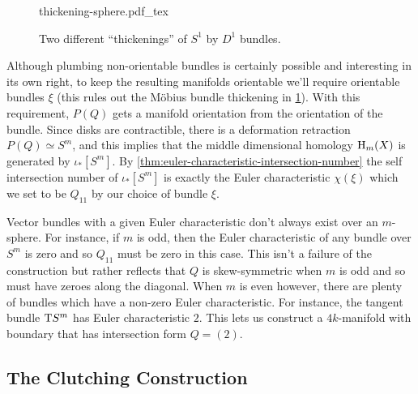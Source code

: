 \begin{figure}[ht]
	\centering
{thickening-sphere.pdf_tex}
\caption{Two different ``thickenings'' of $S^1$ by $D^1$ bundles.}\label{fig:thickening-sphere}
\end{figure}

Although plumbing non-orientable bundles is certainly possible and interesting in its own right, to keep the resulting manifolds orientable we'll require orientable bundles $\xi$ (this rules out the M\"obius bundle thickening in \cref{fig:thickening-sphere}). With this requirement, $P(Q)$ gets a manifold orientation from the orientation of the bundle.
Since disks are contractible, there is a deformation retraction $P(Q)\simeq S^m$, and this implies that the middle dimensional homology $\operatorname{H}_m(X)$ is generated by $\iota_*[S^m]$. By \cref{thm:euler-characteristic-intersection-number} the self intersection number of $\iota_*[S^m]$ is exactly the Euler characteristic $\chi(\xi)$ which we set to be $Q_{11}$ by our choice of bundle $\xi$.

Vector bundles with a given Euler characteristic don't always exist over an $m$-sphere. For instance, if $m$ is odd, then the Euler characteristic of any bundle over $S^m$ is zero and so $Q_{11}$ must be zero in this case. This isn't a failure of the construction but rather reflects that $Q$ is skew-symmetric when $m$ is odd and so must have zeroes along the diagonal. When $m$ is even however, there are plenty of bundles which have a non-zero Euler characteristic. For instance, the tangent bundle $\mathrm{T} S^m$ has Euler characteristic $2$. This lets us construct a $4k$-manifold with boundary that has intersection form $Q = (2)$.

\subsection*{The Clutching Construction}

